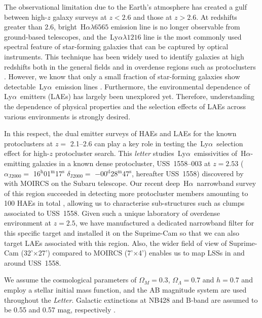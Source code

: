 \documentclass[letters,usenatbib]{mnras}
\def\lya{{\rm\,Ly$\alpha$}}
\def\ha{{\rm\,H$\alpha$}}
\begin{document}
The observational limitation due to the Earth's atmosphere has created a gulf 
between high-$z$ galaxy surveys at $z<2.6$ and those at $z>2.6$. At redshifts 
greater than 2.6, bright \ha$\lambda6565$ emission line is no longer observable 
from ground-based telescopes, and the \lya$\lambda1216$ line is the most commonly 
used spectral feature of star-forming galaxies that can be captured by optical 
instruments. This technique has been widely used to identify galaxies at high 
redshifts both in the general fields and in overdense regions such as 
protoclusters \citep{Ouchi:2003,Venemans:2007}. However, we know that only a small 
fraction of star-forming galaxies show detectable \lya\ emission lines 
\citep{Hayes:2010,Matthee:2016,Hathi:2016}. Furthermore, the environmental 
dependence of \lya\ emitters (LAEs) has largely been unexplored yet. Therefore, 
understanding the dependence of physical properties and the selection effects of 
LAEs across various environments is strongly desired.

In this respect, the dual emitter surveys of HAEs and LAEs for the known 
protoclusters at $z=$ 2.1--2.6 can play a key role in testing the \lya\ selection 
effect for high-$z$ protocluster search. This {\it letter} studies \lya\ 
emissivities of \ha-emitting galaxies in a known dense protocluster, USS~1558--003 
at $z=2.53$ 
($\alpha_\mathrm{J2000}=$ 16$^\mathrm{h}$01$^\mathrm{m}$17$^\mathrm{s}$ 
$\delta_\mathrm{J2000}=$ $-$00$^\mathrm{d}$28$^\mathrm{m}$47$^\mathrm{s}$, 
hereafter USS~1558) discovered by \citet{Kajisawa:2006,Kodama:2007,Hayashi:2012} 
with MOIRCS on the Subaru telescope. Our recent deep \ha\ narrowband survey of 
this region succeeded in detecting more protocluster members amounting to 100 HAEs 
in total \citep{Hayashi:2016}, allowing us to characterise sub-structures such as 
clumps associated to USS~1558. Given such a unique laboratory of overdense 
environment at $z=2.5$, we have manufactured a dedicated narrowband filter for 
this specific target and installed it on the Suprime-Cam so that we can also 
target LAEs associated with this region. Also, the wider field of view of 
Suprime-Cam (32'$\times$27') compared to MOIRCS (7'$\times$4') enables us to map 
LSSs in and around USS~1558.

We assume the cosmological parameters of $\Omega_M=0.3$, $\Omega_\Lambda=0.7$ and 
$h=0.7$ and employ a \citet{Chabrier:2003} stellar initial mass function, and the 
AB magnitude system \citep{Oke:1983} are used throughout the {\it Letter}. 
Galactic extinctions at NB428 and B-band are assumed to be 0.55 and 0.57 mag, 
respectively \citep{Schlegel:1998,Fitzpatrick:1999,Schlafly:2011}\footnotemark[1].
\end{document}
